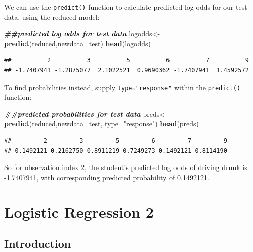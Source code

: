 \documentclass[
]{book}
\newenvironment{Shaded}{\begin{snugshade}}{\end{snugshade}}
\newcommand{\AttributeTok}[1]{\textcolor[rgb]{0.13,0.29,0.53}{#1}}
\newcommand{\DocumentationTok}[1]{\textcolor[rgb]{0.56,0.35,0.01}{\textbf{\textit{#1}}}}
\newcommand{\FunctionTok}[1]{\textcolor[rgb]{0.13,0.29,0.53}{\textbf{#1}}}
\newcommand{\NormalTok}[1]{#1}
\newcommand{\OtherTok}[1]{\textcolor[rgb]{0.56,0.35,0.01}{#1}}
\newcommand{\StringTok}[1]{\textcolor[rgb]{0.31,0.60,0.02}{#1}}
\begin{document}
We can use the \texttt{predict()} function to calculate predicted log odds for our test data, using the reduced model:

\begin{Shaded}
\begin{Highlighting}[]
\DocumentationTok{\#\#predicted log odds for test data}
\NormalTok{logodds}\OtherTok{\textless{}{-}}\FunctionTok{predict}\NormalTok{(reduced,}\AttributeTok{newdata=}\NormalTok{test)}
\FunctionTok{head}\NormalTok{(logodds)}
\end{Highlighting}
\end{Shaded}

\begin{verbatim}
##          2          3          5          6          7          9 
## -1.7407941 -1.2875077  2.1022521  0.9690362 -1.7407941  1.4592572
\end{verbatim}

To find probabilities instead, supply \texttt{type="response"} within the \texttt{predict()} function:

\begin{Shaded}
\begin{Highlighting}[]
\DocumentationTok{\#\#predicted probabilities for test data}
\NormalTok{preds}\OtherTok{\textless{}{-}}\FunctionTok{predict}\NormalTok{(reduced,}\AttributeTok{newdata=}\NormalTok{test, }\AttributeTok{type=}\StringTok{"response"}\NormalTok{)}
\FunctionTok{head}\NormalTok{(preds)}
\end{Highlighting}
\end{Shaded}

\begin{verbatim}
##         2         3         5         6         7         9 
## 0.1492121 0.2162750 0.8911219 0.7249273 0.1492121 0.8114190
\end{verbatim}

So for observation index 2, the student's predicted log odds of driving drunk is -1.7407941, with corresponding predicted probability of 0.1492121.

\hypertarget{logistic2}{%
\chapter{Logistic Regression 2}\label{logistic2}}

\hypertarget{introduction-11}{%
\section{Introduction}\label{introduction-11}}
\end{document}
